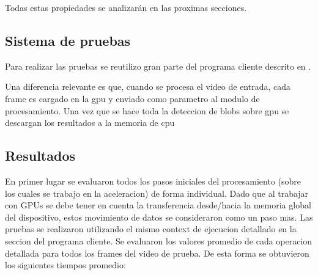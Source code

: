\documentclass[a4paper,10pt]{report}
\begin{document}
 Todas estas propiedades se analizarán en las proximas secciones.

 
 
 
 
 
 
 
 
 
 
 
 
 
 
 
 
 
 
\subsection{Sistema de pruebas}
Para realizar las pruebas se reutilizo gran parte del programa cliente descrito en \cite[capitulo 4]{Jaureguiberry}.

Una diferencia relevante es que, cuando se procesa el video de entrada, cada frame es cargado en la gpu y enviado como parametro al modulo de procesamiento. 
Una vez que se hace toda la deteccion de blobs sobre gpu se descargan los resultados a la memoria de cpu

\subsection{Resultados}


En primer lugar se evaluaron todos los pasos iniciales del procesamiento (sobre los cuales se trabajo en la aceleracion) de forma individual.
Dado que al trabajar con GPUs se debe tener en cuenta la transferencia desde/hacia la memoria global del dispositivo, estos movimiento de datos se consideraron como un paso mas.
Las pruebas se realizaron utilizando el mismo context de ejecucion detallado en la seccion del programa cliente. Se evaluaron los valores promedio de cada operacion detallada para todos los frames del video de prueba.
De esta forma se obtuvieron los siguientes tiempos promedio:
\end{document}
